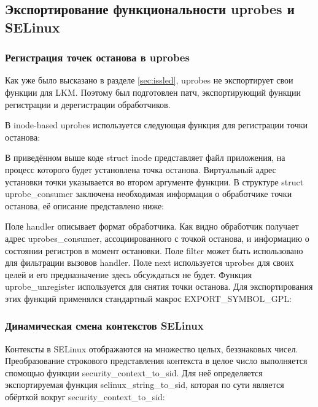 \subsection{Экспортирование функциональности uprobes и SELinux}
\label{sec:uprobe_reg}\subsubsection{Регистрация точек останова в uprobes}

Как уже было высказано в разделе \ref{sec:issled}, uprobes не
экспортирует свои функции для LKM. Поэтому был подготовлен патч,
экспортирующий функции регистрации и дерегистрации обработчиков.

В inode-based uprobes используется следующая функция для регистрации
точки останова:


\bigskip
В приведённом выше коде struct inode представляет файл приложения, на
процесс которого будет установлена точка останова. Виртуальный адрес
установки точки указывается во втором аргументе функции. В структуре
struct uprobe\_consumer заключена необходимая информация о обработчике
точки останова, её описание представлено ниже:


\bigskip

Поле handler описывает формат обработчика. Как видно обработчик получает
адрес uprobes\_consumer, ассоциированного с точкой останова, и
информацию о состоянии регистров в момент остановки. Поле filter может
быть использовано для фильтрации вызовов handler. Поле next используется
uprobes для своих целей и его предназначение здесь обсуждаться не будет.
Функция uprobe\_unregister используется для снятия точки останова. Для
экспортирования этих функций применялся стандартный макрос
EXPORT\_SYMBOL\_GPL:


\subsubsection{Динамическая смена контекстов SELinux}

Контексты в SELinux отображаются на множество целых, беззнаковых чисел.
Преобразование строкового представления контекста в целое число
выполняется спомощью функции security\_context\_to\_sid. Для неё
определяется экспортируемая функция selinux\_string\_to\_sid, которая по
сути является обёрткой вокруг security\_context\_to\_sid:


